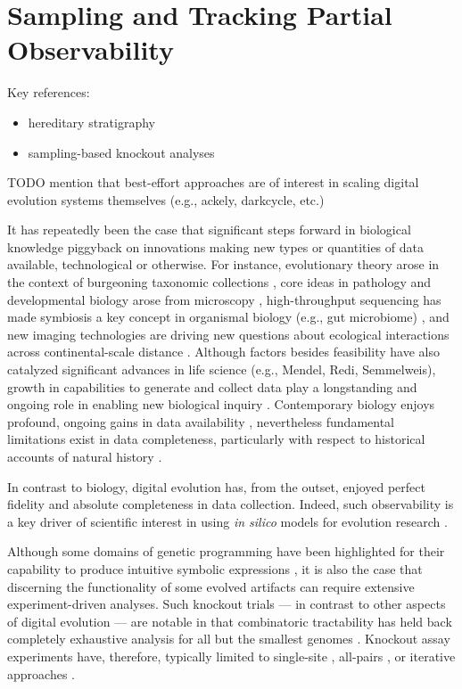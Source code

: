 \section{Sampling and Tracking Partial Observability}
\label{sec:best-effort}

Key references:
\begin{itemize}
\item hereditary stratigraphy \citep{moreno2022hereditary,moreno2024guide}
\item sampling-based knockout analyses \citep{moreno2024methods}
\end{itemize}

TODO mention that best-effort approaches are of interest in scaling digital evolution systems themselves (e.g., ackely, darkcycle, etc.)

\citep{moreno2022hstrat,moreno2024guide}

It has repeatedly been the case that significant steps forward in biological knowledge piggyback on innovations making new types or quantities of data available, technological or otherwise.
For instance, evolutionary theory arose in the context of burgeoning taxonomic collections \citep{winsor2009taxonomy}, core ideas in pathology and developmental biology arose from microscopy \citep{turner1890cell}, high-throughput sequencing has made symbiosis a key concept in organismal biology (e.g., gut microbiome) \citep{durack2019gut}, and new imaging technologies are driving new questions about ecological interactions across continental-scale distance \citep{stark2016toward}.
Although factors besides feasibility have also catalyzed significant advances in life science (e.g., Mendel, Redi, Semmelweis), growth in capabilities to generate and collect data play a longstanding and ongoing role in enabling new biological inquiry \citep{strasser2012data}.
Contemporary biology enjoys profound, ongoing gains in data availability \citep{sulston1983embryonic,sheth2017multiplex,weeks2023deep}, nevertheless fundamental limitations exist in data completeness, particularly with respect to historical accounts of natural history \citep{benton2011assessing,delsuc2005phylogenomics}.

In contrast to biology, digital evolution has, from the outset, enjoyed perfect fidelity and absolute completeness in data collection.
Indeed, such observability is a key driver of scientific interest in using \textit{in silico} models for evolution research \citep{o2003digital}.

Although some domains of genetic programming have been highlighted for their capability to produce intuitive symbolic expressions \citep{hu2023genetic,javed2022simplification}, it is also the case that discerning the functionality of some evolved artifacts can require extensive experiment-driven analyses.
Such knockout trials --- in contrast to other aspects of digital evolution --- are notable in that combinatoric tractability has held back completely exhaustive analysis for all but the smallest genomes \citep{nitash2021information}.
Knockout assay experiments have, therefore, typically limited to single-site \citep{adami2006digital}, all-pairs \citep{kumawat2023fluctuating}, or iterative approaches \citep{langdon2014improving,moreno2021case}.

